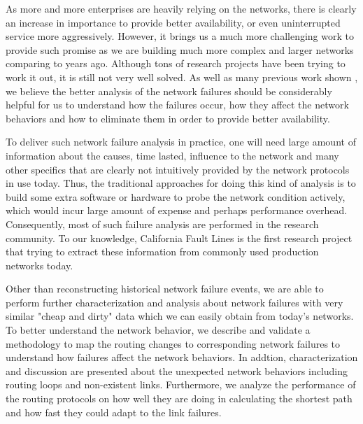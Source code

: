 \documentclass[conference, twocolumn, oneside, 10pt]{IEEEtran}
\begin{document}
As more and more enterprises are heavily relying on the networks, there is clearly an increase in importance to provide better availability, or even uninterrupted service more aggressively. However, it brings us a much more challenging work to provide such promise as we are building much more complex and larger networks comparing to years ago. Although tons of research projects have been trying to work it out, it is still not very well solved. As well as many previous work shown \cite{labovitz1999experimental, markopoulou2008characterization, padmanabhan2006study}, we believe the better analysis of the network failures should be considerably helpful for us to understand how the failures occur, how they affect the network behaviors and how to eliminate them in order to provide better availability.

To deliver such network failure analysis in practice, one will need large amount of information about the causes, time lasted, influence to the network and many other specifics that are clearly not intuitively provided by the network protocols in use today. Thus, the traditional approaches \cite{paxson1997end, cunha2011predicting} for doing this kind of analysis is to build some extra software or hardware to probe the network condition actively, which would incur large amount of expense and perhaps performance overhead. Consequently, most of such failure analysis are performed in the research community. To our knowledge, California Fault Lines \cite{turner2010california} is the first research project that trying to extract these information from commonly used production networks today.

Other than reconstructing historical network failure events, we are able to perform further characterization and analysis about network failures with very similar "cheap and dirty" data which we can easily obtain from today's networks. To better understand the network behavior, we describe and validate a methodology to map the routing changes to corresponding network failures to understand how failures affect the network behaviors. In addtion, characterization and discussion are presented about the unexpected network behaviors including routing loops and non-existent links. Furthermore, we analyze the performance of the routing protocols on how well they are doing in calculating the shortest path and how fast they could adapt to the link failures.
\end{document}

